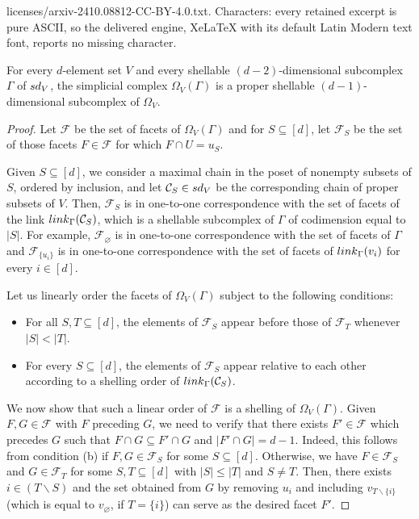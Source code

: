 \documentclass[10pt,a4paper]{amsart}
\newcommand{\cC}{{\mathcal C}}
\newcommand{\fF}{{\mathcal F}}
\newcommand{\link}{{\rm link}}
\newcommand{\sd}{{\rm sd}}
\newcommand{\sm}{{\smallsetminus}}
\renewcommand{\subset}{\subseteq}
\begin{document}
licenses/arxiv-2410.08812-CC-BY-4.0.txt. Characters: every retained excerpt is pure ASCII, so the delivered engine, XeLaTeX with its default Latin Modern text font, reports no missing character.
\begin{lemma} \label{lem:shellability-a}
For every $d$-element set $V$ and every shellable 
$(d-2)$-dimensional subcomplex $\Gamma$ of $\sd_V$, the 
simplicial complex $\Omega_V(\Gamma)$ is a proper shellable 
$(d-1)$-dimensional subcomplex of $\Omega_V$.
\end{lemma}

\begin{proof}
Let $\fF$ be the set of facets of $\Omega_V(\Gamma)$ and for 
$S \subset [d]$, let $\fF_S$ be the set of those facets 
$F \in \fF$ for which $F \cap U = u_S$. 

Given $S \subset [d]$, we consider a maximal chain in the 
poset of nonempty subsets of $S$, ordered by inclusion, and 
let $\cC_S \in \sd_V$ be the corresponding chain of proper 
subsets of $V$. Then, $\fF_S$ is in one-to-one correspondence 
with the set of facets of the link $\link_\Gamma(\cC_S)$, which 
is a shellable subcomplex of $\Gamma$ of codimension equal to 
$|S|$. For example, $\fF_\varnothing$ is in one-to-one 
correspondence with the set of facets of $\Gamma$ and 
$\fF_{ \{u_i\} }$ is in one-to-one correspondence with the 
set of facets of $\link_\Gamma(v_i)$ for every $i \in [d]$.

Let us linearly order the facets of $\Omega_V(\Gamma)$ 
subject to the following conditions:
%
\begin{itemize}
\item[(a)] 
For all $S, T \subset [d]$, the elements of $\fF_S$ appear 
before those of $\fF_T$ whenever $|S| < |T|$.

\item[(b)] 
For every $S \subset [d]$, the elements of $\fF_S$ appear 
relative to each other according to a shelling order of 
$\link_\Gamma(\cC_S)$.
\end{itemize}

We now show that such a linear order of $\fF$ is a shelling 
of $\Omega_V(\Gamma)$. Given $F, G \in \fF$ with $F$ preceding 
$G$, we need to verify that there exists $F' \in \fF$ which 
precedes $G$ such that $F \cap G \subseteq F' \cap G$ and 
$|F' \cap G| = d-1$. Indeed, this follows from condition (b) 
if $F, G \in \fF_S$ for some $S \subset [d]$. Otherwise, we 
have $F \in \fF_S$ and $G \in \fF_T$ for some $S, T \subset 
[d]$ with $|S| \le |T|$ and $S \ne T$. Then, there exists 
$i \in (T \sm S)$ and the set obtained from $G$ by removing 
$u_i$ and including $v_{T \sm \{i\}}$ (which is equal to 
$v_\varnothing$, if $T = \{i\}$) can serve as the desired 
facet $F'$. 
\end{proof}
\end{document}
